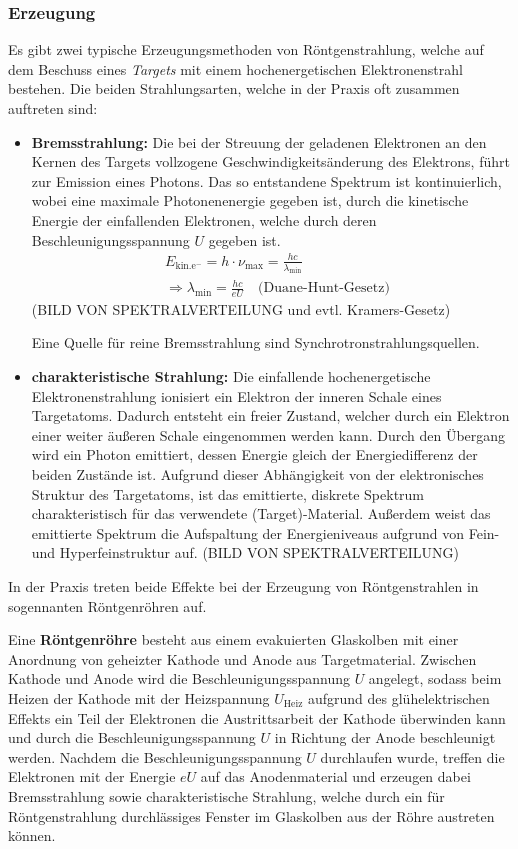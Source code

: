 \documentclass[10pt, a4paper]{article}
\begin{document}
\subsubsection{Erzeugung}
Es gibt zwei typische Erzeugungsmethoden von Röntgenstrahlung, welche auf dem Beschuss eines \emph{Targets} mit einem hochenergetischen Elektronenstrahl bestehen.
Die beiden Strahlungsarten, welche in der Praxis oft zusammen auftreten sind:
\begin{itemize}
  \item \textbf{Bremsstrahlung:} Die bei der Streuung der geladenen Elektronen an den Kernen des Targets vollzogene Geschwindigkeitsänderung des Elektrons, führt zur Emission eines Photons.
  Das so entstandene Spektrum ist kontinuierlich, wobei eine maximale Photonenenergie gegeben ist, durch die kinetische Energie der einfallenden Elektronen, welche durch deren Beschleunigungsspannung $U$ gegeben ist.
  \begin{align}
    &E_\mathrm{kin. e^-} = h \cdot \nu_\mathrm{max} = \frac{hc}{\lambda_\mathrm{min}} \nonumber\\
    &\Rightarrow \lambda_\mathrm{min} = \frac{h c}{e U} \quad \text{(Duane-Hunt-Gesetz)}
  \end{align}
  (BILD VON SPEKTRALVERTEILUNG und evtl. Kramers-Gesetz)
  
  Eine Quelle für reine Bremsstrahlung sind Synchrotronstrahlungsquellen.
  
  \item \textbf{charakteristische Strahlung:} Die einfallende hochenergetische Elektronenstrahlung ionisiert ein Elektron der inneren Schale eines Targetatoms.
  Dadurch entsteht ein freier Zustand, welcher durch ein Elektron einer weiter äußeren Schale eingenommen werden kann.
  Durch den Übergang wird ein Photon emittiert, dessen Energie gleich der Energiedifferenz der beiden Zustände ist.
  Aufgrund dieser Abhängigkeit von der elektronisches Struktur des Targetatoms, ist das emittierte, diskrete Spektrum charakteristisch für das verwendete (Target)-Material.
  Außerdem weist das emittierte Spektrum die Aufspaltung der Energieniveaus aufgrund von Fein- und Hyperfeinstruktur auf.
  (BILD VON SPEKTRALVERTEILUNG)
\end{itemize}
In der Praxis treten beide Effekte bei der Erzeugung von Röntgenstrahlen in sogennanten Röntgenröhren auf.

Eine \textbf{Röntgenröhre} besteht aus einem evakuierten Glaskolben mit einer Anordnung von geheizter Kathode und Anode aus Targetmaterial.
Zwischen Kathode und Anode wird die Beschleunigungsspannung $U$ angelegt, sodass beim Heizen der Kathode mit der Heizspannung $U_\mathrm{Heiz}$ aufgrund des glühelektrischen Effekts ein Teil der Elektronen die Austrittsarbeit der Kathode überwinden kann und durch die Beschleunigungsspannung $U$ in Richtung der Anode beschleunigt werden.
Nachdem die Beschleunigungsspannung $U$ durchlaufen wurde, treffen die Elektronen mit der Energie $e U$ auf das Anodenmaterial und erzeugen dabei Bremsstrahlung sowie charakteristische Strahlung, welche durch ein für Röntgenstrahlung durchlässiges Fenster im Glaskolben aus der Röhre austreten können.
\end{document}
